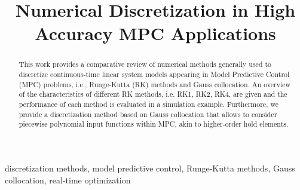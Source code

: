 \documentclass[conference]{IEEEtran}
\begin{document}
\title{Numerical Discretization in High Accuracy MPC Applications
}

\author{
}

\maketitle


\begin{abstract}
This work provides a comparative review of numerical methods generally used to discretize continuous-time linear system models appearing in Model Predictive Control (MPC) problems, i.e., Runge-Kutta (RK) methods and Gauss collocation. An overview of the characteristics of different RK methods, i.e. RK1, RK2, RK4, are given and the performance of each method is evaluated in a simulation example. Furthermore, we provide a discretization method based on Gauss collocation that allows to consider piecewise polynomial input functions within MPC, akin to higher-order hold elements.
\end{abstract}

\begin{IEEEkeywords}
discretization methods, model predictive control, Runge-Kutta methods, Gauss collocation, real-time optimization
\end{IEEEkeywords}









\appendices

%





\end{document}
